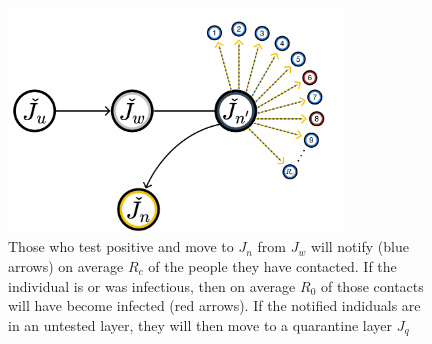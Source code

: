 \documentclass[notitlepage, superscriptaddress]{revtex4-2}
\begin{document}
\begin{figure}
\centering
\includegraphics[width=3.5in]{notification scheme}
\caption{\label{f:SEIR-notification}
 Those who test positive and move to $J_{n}$ from $J_{w}$ will notify (blue arrows) on average $R_{c}$ of the people they have contacted. If the individual is or was infectious, then on average $R_{0}$ of those contacts will have become infected (red arrows). If the notified indiduals are in an untested layer, they will then move to a quarantine layer $J_{q}$}
\end{figure}
\end{document}

